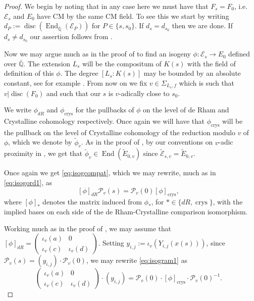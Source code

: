 \documentclass[12pt,twoside,a4paper]{article}
\theoremstyle{plain}%
\DeclareMathOperator{\End}{End}
\DeclareMathOperator{\disc}{disc}
\DeclareMathOperator{\crys}{crys}
\newcommand{\Q}{\mathbb{Q}}
\newcommand{\CE}{\mathcal{E}}
\newcommand{\CP}{\mathcal{P}}
\begin{document}
\begin{proof}We begin by noting that in any case here we must have that $F_s=F_0$, i.e. $\CE_s$ and $E_0$ have CM by the same CM field. To see this we start by writing $d_P:=\disc(\End_{\bar{\Q}}(\CE_P))$ for $P\in\{s,s_0\}$. If $d_s=d_{s_0}$ then we are done. If $d_s\neq d_{s_0}$ our assertion follows from .
	
Now we may argue much as  in the proof of  to find an isogeny $\phi:\CE_s\rightarrow E_0$ defined over $\bar{\Q}$. The extension $L_s$ will be the compositum of $K(s)$ with the field of definition of this $\phi$. The degree $[L_s:K(s)]$ may be bounded by an absolute constant, see for example \cite{silverberg}. From now on we fix $v\in \Sigma_{L_s,f}$ which is such that $v|\disc(F_0)$ and such that our $s$ is $v$-adically close to $s_0$.

We write $\phi_{dR}$ and $\phi_{\crys}$ for the pullbacks of $\phi$ on the level of de Rham and Crystalline cohomology respectively. Once again we will have that $\phi_{\crys}$ will be the pullback on the level of Crystalline cohomology of the reduction modulo $v$ of $\phi$, which we denote by $\tilde{\phi}_v$. As in the proof of , by our conventions on $v$-adic proximity in , we get that $\tilde{\phi}_v\in \End(\tilde{E}_{0,v})$ since $\tilde{\CE}_{s,v}=\tilde{E}_{0,v}$.

Once again we get \eqref{eq:isogcompat}, which we may rewrite, much as in \eqref{eq:isogord1}, as 
\begin{equation}\label{eq:isogram1}	[\phi]_{dR}\CP_v(s)=\CP_v(0)[\phi]_{\crys},
\end{equation}where $[\phi]_{*}$ denotes the matrix induced from $\phi_{*}$, for $*\in \{dR,\crys\}$, with the implied bases on each side of the de Rham-Crystalline comparison isomorphism.
	
Working much as in the proof of , we may assume that $[\phi]_{dR}=\begin{pmatrix}\iota_v(a)&0\\ \iota_v(c)&\iota_v(d)\end{pmatrix}$. Setting $y_{i,j}:=\iota_v(Y_{i,j}(x(s)))$, since $\CP_v(s)= (y_{i,j})\cdot \CP_v(0)$, we may rewrite \eqref{eq:isogram1} as 
	\begin{equation}\label{eq:ramif2}
		\begin{pmatrix}
			\iota_v(a)&0\\ \iota_v(c)&\iota_v(d)
		\end{pmatrix}\cdot (y_{i,j})= \CP_v(0)\cdot [{\phi}]_{\crys} \cdot \CP_v(0)^{-1}.
	\end{equation}
	

\end{proof}
\end{document}
